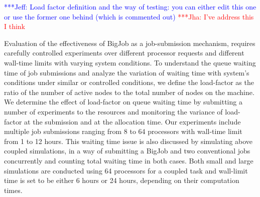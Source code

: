 \documentclass[conference,final]{IEEEtran}
\newcommand{\jhanote}[1]{ {\textcolor{red} { ***Jha: #1 }}}
\newcommand{\skonote}[1]{ {\textcolor{blue} { ***Jeff: #1 }}}
\newcommand{\jhanote}[1]{}
\newcommand{\skonote}[1]{}
\begin{document}

\skonote{Load factor definition and the way of testing: you can either
  edit this one or use the former one behind (which is commented out)}
\jhanote{I've address this I think}

Evaluation of the effectiveness of BigJob as a job-submission
mechanism, requires carefully controlled experiments over different
processor requests and different wall-time limits with varying system
conditions.  To understand the queue waiting time of job submissions
and analyze the variation of waiting time with system's conditions
under similar or controlled conditions, we define the load-factor as
the ratio of the number of active nodes to the total number of nodes
on the machine. We determine the effect of load-factor on queue
waiting time by submitting a number of experiments to the resources
and monitoring the variance of load-factor at the submission and at
the allocation time. Our experiments include multiple job submissions
ranging from 8 to 64 processors with wall-time limit from 1 to 12
hours. This waiting time issue is also discussed by simulating above
coupled simulations, in a way of submitting a BigJob and two
conventional jobs concurrently and counting total waiting time in both
cases. Both small and large simulations are conducted using 64
processors for a coupled task and wall-limit time is set to be either
6 hours or 24 hours, depending on their computation times.
\end{document}
